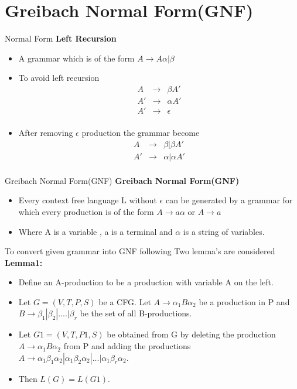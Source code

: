 \documentclass{beamer}
\begin{document}
\section{Greibach Normal Form(GNF)}
\begin{frame}{Normal Form}
	\textbf{Left Recursion}
	\begin{itemize}
		\item A grammar which is of the form $A\rightarrow A \alpha|\beta$
		\item To avoid left recursion
		\begin{eqnarray*}
			A&\rightarrow& \beta A'\\
			A'&\rightarrow& \alpha A'\\
			A'&\rightarrow& \epsilon\\
		\end{eqnarray*}
	\item After removing $\epsilon$ production the grammar become
	\begin{eqnarray*}
			A&\rightarrow& \beta \big | \beta A'\\
		A'&\rightarrow& \alpha \big | \alpha A'\\
	\end{eqnarray*}
	\end{itemize}
\end{frame}
\begin{frame}{Greibach Normal Form(GNF)}
	\textbf{Greibach Normal Form(GNF)}
	\begin{itemize}
		\item Every context free language L without $\epsilon$ can be generated by a grammar for which every production is of the form $A\rightarrow a\alpha$ or $A\rightarrow a$
		\item Where A is a variable , a is a terminal and $\alpha$ is a string of variables.
	\end{itemize}
To convert given grammar into GNF following Two lemma's are considered\\
\textbf{Lemma1:}
\begin{itemize}
	\item Define an A-production to be a production with variable A on the left. 
	\item Let $G = (V, T, P, S)$ be a CFG. Let $A \rightarrow  \alpha_1B\alpha_2$ be a production in P and 
	$B\rightarrow \beta_1 | \beta_2|....|\beta_r$ be the set of all B-productions.
	\item Let $G1 = (V, T, P1, S)$ 
	be obtained from G by deleting the production $A \rightarrow  \alpha_1B\alpha_2$ from P and 
	adding the productions $A\rightarrow  \alpha_1\beta_1\alpha_2 | \alpha_1\beta_2\alpha_2 |...| \alpha_1\beta_r\alpha_2.$
	\item Then $L(G) = 	L(G1).$
\end{itemize}
\end{frame}
\end{document}
